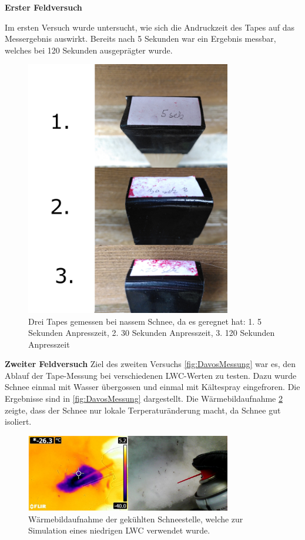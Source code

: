 


\textbf{Erster Feldversuch}
\label{ersterFeldVer}

Im ersten Versuch wurde untersucht, wie sich die Andruckzeit des Tapes auf das Messergebnis auswirkt. Bereits nach 5 Sekunden war ein Ergebnis messbar, welches bei 120 Sekunden ausgeprägter wurde.

\begin{figure}[H]
    \centering
    \includegraphics[width=0.8\textwidth]{Bilder/ZeitAbha.png}
    \caption{Drei Tapes gemessen bei nassem Schnee, da es geregnet hat: 1. 5 Sekunden Anpresszeit, 2. 30 Sekunden Anpresszeit, 3. 120 Sekunden Anpresszeit} 
    \label{fig:ZeitDruck}
\end{figure}

\newpage
\textbf{Zweiter Feldversuch}
\label{zweitFeldVer}
Ziel des zweiten Versuchs \ref{fig:DavosMessung} war es, den Ablauf der Tape-Messung bei verschiedenen LWC-Werten zu testen. Dazu wurde Schnee einmal mit Wasser übergossen und einmal mit Kältespray eingefroren. Die Ergebnisse sind in \ref{fig:DavosMessung} dargestellt. Die Wärmebildaufnahme \ref{fig:KaltSchnee} zeigte, dass der Schnee nur lokale Terperaturänderung macht, da Schnee gut isoliert. 

\begin{figure}[H]
    \centering
    \includegraphics[width=0.8\textwidth]{Bilder/KalterSchnee.png}
    \caption{Wärmebildaufnahme der gekühlten Schneestelle, welche zur Simulation eines niedrigen LWC verwendet wurde.} 
    \label{fig:KaltSchnee}
\end{figure}




